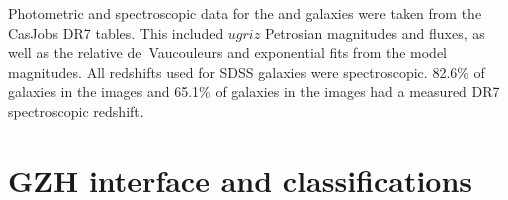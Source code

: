 \documentclass[twocolumn]{aastex6}
\begin{document}

Photometric and spectroscopic data for the \stripe{} and \coadd{} galaxies were taken
from the CasJobs DR7 tables. This included $ugriz$ Petrosian magnitudes and
fluxes, as well as the relative de~Vaucouleurs and exponential fits from the
model magnitudes. All redshifts used for SDSS galaxies were spectroscopic.
82.6\% of galaxies in the \stripe{} images and 65.1\% of galaxies in the
\coadd{} images had a measured DR7 spectroscopic redshift. 

\section{GZH interface and classifications}\label{sec:interface}
\end{document}
